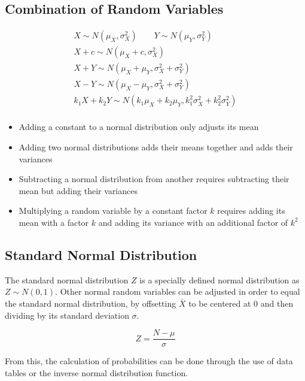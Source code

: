 \documentclass[../main]{subfiles}
\begin{document}
	\subsection{Combination of Random Variables}

	\begin{equation*} \begin{gathered}
		X \sim N(\mu_X,\sigma_X^2) \qquad Y \sim N(\mu_Y,\sigma_Y^2) \\
		X + c \sim N(\mu_X + c,\sigma_X^2) \\
		X + Y \sim N(\mu_X + \mu_Y,\sigma_X^2 + \sigma_Y^2) \\
		X - Y \sim N(\mu_X - \mu_Y,\sigma_X^2 + \sigma_Y^2) \\
		k_1 X + k_2 Y \sim N(k_1 \mu_X + k_2 \mu_Y,k_1^2 \sigma_X^2 + k_2^2 \sigma_Y^2) \\
	\end{gathered} \end{equation*}

	\begin{itemize}
		\item Adding a constant to a normal distribution only adjusts its mean
		\item Adding two normal distributions adds their means together and adds their variances
		\item Subtracting a normal distribution from another requires subtracting their mean but adding their variances
		\item Multiplying a random variable by a constant factor \(k\) requires adding its mean with a factor \(k\) and adding its variance with an additional factor of \(k^2\)
	\end{itemize}

	\subsection{Standard Normal Distribution}

	The standard normal distribution \(Z\) is a specially defined normal distribution as \(Z \sim N(0,1)\). Other normal random variables can be adjusted in order to equal the standard normal distribution, by offsetting \(\bar{X}\) to be centered at \(0\) and then dividing by its standard deviation \(\sigma\).

	\[ Z = \frac{N-\mu}{\sigma} \]

	From this, the calculation of probabilities can be done through the use of data tables or the inverse normal distribution function. \\
\end{document}
